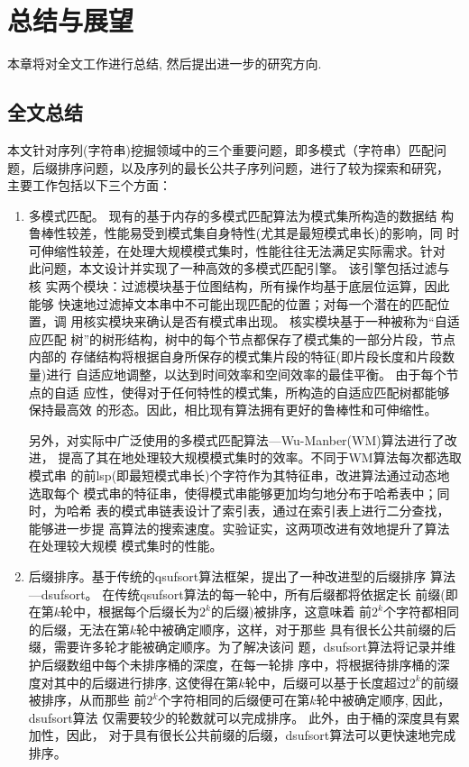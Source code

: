 \chapter{总结与展望}

本章将对全文工作进行总结, 然后提出进一步的研究方向.

\section{全文总结}

本文针对序列(字符串)挖掘领域中的三个重要问题，即多模式（字符串）匹配问
题，后缀排序问题，以及序列的最长公共子序列问题，进行了较为探索和研究，
主要工作包括以下三个方面：

\begin{enumerate}
\item 多模式匹配。 现有的基于内存的多模式匹配算法为模式集所构造的数据结
  构鲁棒性较差，性能易受到模式集自身特性(尤其是最短模式串长)的影响，同
  时可伸缩性较差，在处理大规模模式集时，性能往往无法满足实际需求。针对
  此问题，本文设计并实现了一种高效的多模式匹配引擎。 该引擎包括过滤与核
  实两个模块：过滤模块基于位图结构，所有操作均基于底层位运算，因此能够
  快速地过滤掉文本串中不可能出现匹配的位置；对每一个潜在的匹配位置，调
  用核实模块来确认是否有模式串出现。 核实模块基于一种被称为“自适应匹配
  树”的树形结构，树中的每个节点都保存了模式集的一部分片段，节点内部的
  存储结构将根据自身所保存的模式集片段的特征(即片段长度和片段数量)进行
  自适应地调整，以达到时间效率和空间效率的最佳平衡。 由于每个节点的自适
  应性，使得对于任何特性的模式集，所构造的自适应匹配树都能够保持最高效
  的形态。因此，相比现有算法拥有更好的鲁棒性和可伸缩性。

  另外，对实际中广泛使用的多模式匹配算法---Wu-Manber(WM)算法进行了改进，
  提高了其在地处理较大规模模式集时的效率。不同于WM算法每次都选取模式串
  的前lsp(即最短模式串长)个字符作为其特征串，改进算法通过动态地选取每个
  模式串的特征串，使得模式串能够更加均匀地分布于哈希表中；同时，为哈希
  表的模式串链表设计了索引表，通过在索引表上进行二分查找，能够进一步提
  高算法的搜索速度。实验证实，这两项改进有效地提升了算法在处理较大规模
  模式集时的性能。

\item 后缀排序。基于传统的qsufsort算法框架，提出了一种改进型的后缀排序
  算法---dsufsort。 在传统qsufsort算法的每一轮中，所有后缀都将依据定长
  前缀(即在第$k$轮中，根据每个后缀长为$2^k$的后缀)被排序，这意味着
  前$2^k$个字符都相同的后缀，无法在第$k$轮中被确定顺序，这样，对于那些
  具有很长公共前缀的后缀，需要许多轮才能被确定顺序。为了解决该问
  题，dsufsort算法将记录并维护后缀数组中每个未排序桶的深度，在每一轮排
  序中，将根据待排序桶的深度对其中的后缀进行排序,
  这使得在第$k$轮中，后缀可以基于长度超过$2^k$的前缀被排序，从而那些
  前$2^k$个字符相同的后缀便可在第$k$轮中被确定顺序, 因此，dsufsort算法
  仅需要较少的轮数就可以完成排序。 此外，由于桶的深度具有累加性，因此，
  对于具有很长公共前缀的后缀，dsufsort算法可以更快速地完成排序。


\end{enumerate}
